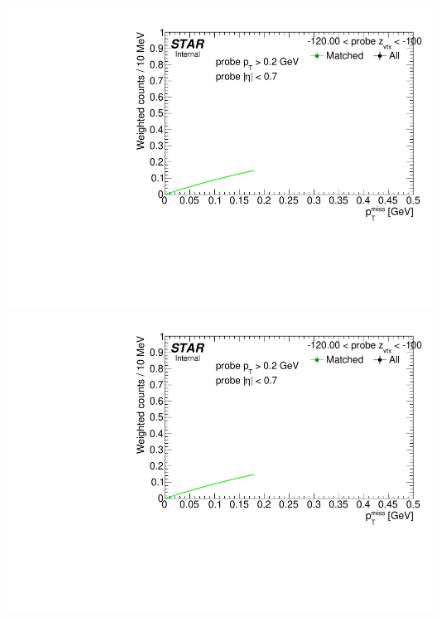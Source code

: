 \begin{figure}[h!]
{  \includegraphics[width=\linewidth,page=8]{graphics/correctionsToEff/TOF_tagAndProbe/Fitting_effVsZVtx_data.CPT2.pdf}\\
  \includegraphics[width=\linewidth,page=10]{graphics/correctionsToEff/TOF_tagAndProbe/Fitting_effVsZVtx_data.CPT2.pdf}

}
\end{figure}
